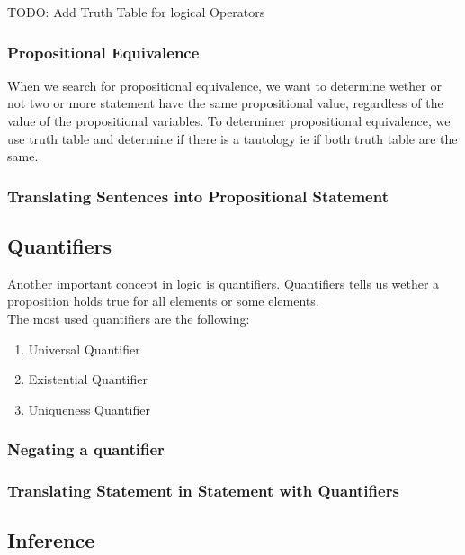 \documentclass{article}
\begin{document}
TODO: Add Truth Table for logical Operators

\subsubsection{Propositional Equivalence}

When we search for propositional equivalence, we want to determine wether or not
two or more statement have the same propositional value, regardless of the value
of the propositional variables. To determiner propositional equivalence, we use
truth table and determine if there is a tautology ie if both truth table are the
same.

\subsubsection{Translating Sentences into Propositional Statement}

\subsection{Quantifiers}

Another important concept in logic is quantifiers. Quantifiers tells us wether
a proposition holds true for all elements or some elements.\\

The most used quantifiers are the following:

    \begin{enumerate}
	\item Universal Quantifier
	\item Existential Quantifier
	\item Uniqueness Quantifier
    \end{enumerate}

\subsubsection{Negating a quantifier}

\subsubsection{Translating Statement in Statement with Quantifiers}

\subsection{Inference}
\end{document}
